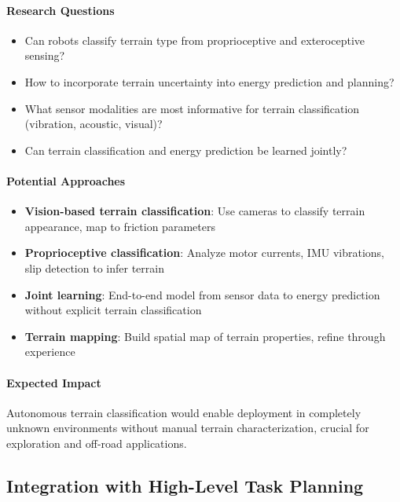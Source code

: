 \paragraph{Research Questions}
\begin{itemize}
    \item Can robots classify terrain type from proprioceptive and exteroceptive sensing?
    \item How to incorporate terrain uncertainty into energy prediction and planning?
    \item What sensor modalities are most informative for terrain classification (vibration, acoustic, visual)?
    \item Can terrain classification and energy prediction be learned jointly?
\end{itemize}

\paragraph{Potential Approaches}
\begin{itemize}
    \item \textbf{Vision-based terrain classification}: Use cameras to classify terrain appearance, map to friction parameters
    \item \textbf{Proprioceptive classification}: Analyze motor currents, IMU vibrations, slip detection to infer terrain
    \item \textbf{Joint learning}: End-to-end model from sensor data to energy prediction without explicit terrain classification
    \item \textbf{Terrain mapping}: Build spatial map of terrain properties, refine through experience
\end{itemize}

\paragraph{Expected Impact}
Autonomous terrain classification would enable deployment in completely unknown environments without manual terrain characterization, crucial for exploration and off-road applications.

\subsection{Integration with High-Level Task Planning}

